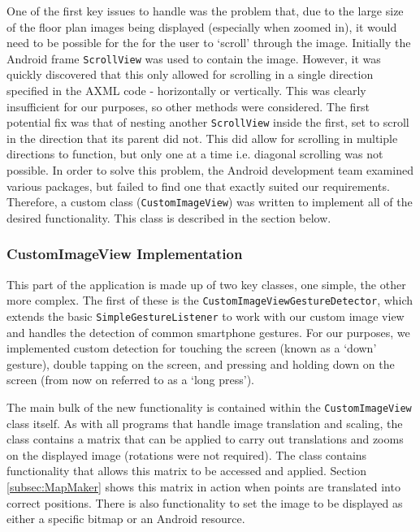 \documentclass[12pt,a4paper]{report}
\begin{document}
            One of the first key issues to handle was the problem that, due to the large size of the floor plan images being displayed (especially when zoomed in), it would need
            to be possible for the for the user to `scroll' through the image. Initially the Android frame \texttt{ScrollView} was used to contain the image. However, it was quickly
            discovered that this only allowed for scrolling in a single direction specified in the AXML code - horizontally or vertically.
            This was clearly insufficient for our purposes, so other methods
            were considered. The first potential fix was that of nesting another \texttt{ScrollView} inside the first, set to scroll in the direction that its parent did not.
            This did allow for scrolling in multiple directions to function, but only one at a time i.e. diagonal scrolling was not possible. In order to solve this problem,
            the Android development team examined various packages, but failed to find one that exactly suited our requirements. Therefore, a custom class
            (\texttt{CustomImageView}) was written to implement all of the desired functionality. This class is described in the section below.
            \subsubsection{CustomImageView Implementation}
                This part of the application is made up of two key classes, one simple, the other more complex. The first of these is the \texttt{CustomImageViewGestureDetector},
                which extends the basic \texttt{SimpleGestureListener} to work with our custom image view and handles the detection of common smartphone gestures. For our purposes,
                we implemented custom detection for touching the screen (known as a `down' gesture), double tapping on the screen, and pressing and holding down on the screen
                (from now on referred to as a `long press').
                
                The main bulk of the new functionality is contained within the \texttt{CustomImageView} class itself. As with all programs that handle image translation and scaling,
                the class contains a matrix that can be applied to carry out translations and zooms on the displayed image (rotations were not required). The class contains functionality
                that allows this matrix to be accessed and applied. Section \ref{subsec:MapMaker} shows this matrix in action when points are translated into correct positions.
                There is also functionality to set the image to be displayed as either a specific bitmap or an Android resource.
                
\end{document}
